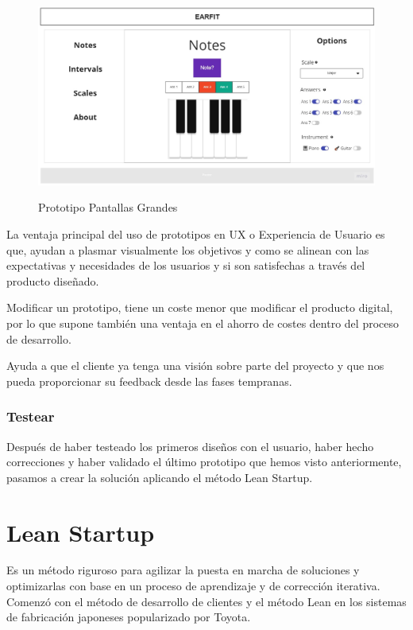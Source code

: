 \documentclass[12pt,twoside,titlepage]{report}
\begin{document}
    \begin{figure}[H]
        \centering
        \includegraphics[scale=0.28]{Design Thinking/Prototipo/Large/Notes}
        \label{fig:PrototipoLarge}
        \caption{Prototipo Pantallas Grandes}
    \end{figure}

La ventaja principal del uso de prototipos en UX o Experiencia de Usuario es que, ayudan a plasmar visualmente los objetivos y como se alinean con las expectativas y necesidades de los usuarios y si son satisfechas a través del producto diseñado.

Modificar un prototipo, tiene un coste menor que modificar el producto digital, por lo que supone también una ventaja en el ahorro de costes dentro del proceso de desarrollo.

Ayuda a que el cliente ya tenga una visión sobre parte del proyecto y que nos pueda proporcionar su feedback desde las fases tempranas.

\subsubsection{Testear}

Después de haber testeado los primeros diseños con el usuario, haber hecho correcciones y haber validado el último prototipo que hemos visto anteriormente, pasamos a crear la solución aplicando el método Lean Startup.

\section{Lean Startup}

Es un método riguroso para agilizar la puesta en marcha de soluciones y optimizarlas con base en un proceso de aprendizaje y de corrección iterativa. Comenzó con el método de desarrollo de clientes y el método Lean en los sistemas de fabricación japoneses popularizado por Toyota.
\end{document}
